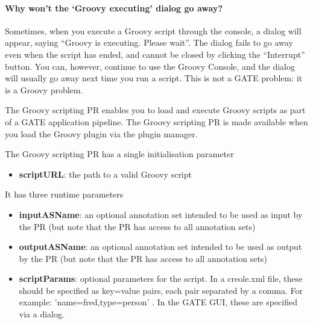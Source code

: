 \paragraph{Why won't the `Groovy executing' dialog go away?}

Sometimes, when you execute a Groovy script through the console, a dialog will
appear, saying ``Groovy is executing. Please wait''. The dialog fails to go
away even when the script has ended, and cannot be closed by clicking the
``Interrupt'' button. You can, however, continue to use the Groovy Console,
and the dialog will usually go away next time you run a script. This is not a
GATE problem: it is a Groovy problem.


The Groovy scripting PR enables you to load and execute Groovy scripts as part
of a GATE application pipeline. The Groovy scripting PR is made available when
you load the Groovy plugin via the plugin manager.


The Groovy scripting PR has a single initialisation parameter

\begin{itemize}
\item \textbf{scriptURL}: the path to a valid Groovy script
\end{itemize}

It has three runtime parameters

\begin{itemize}
\item \textbf{inputASName}: an optional annotation set intended to be used as input by
  the PR (but note that the PR has access to all annotation sets)
\item \textbf{outputASName}: an optional annotation set intended to be used as output by
  the PR (but note that the PR has access to all annotation sets)
\item \textbf{scriptParams}: optional parameters for the script. In a
  creole.xml file, these should be specified as key=value pairs,
  each pair separated by a comma. For example: 'name=fred,type=person' . In
  the GATE GUI, these are specified via a dialog.
\end{itemize}


